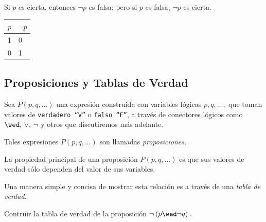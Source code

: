 \begin{definicion}[Negación]
 Si $p$ es cierta, entonces $\neg p$ es falsa; pero si $p$ es falsa, $\neg p$ es cierta.

\end{definicion}

 	\begin{tdv}[Negación] \hfill
 		\label{tdv:not}
 		\begin{center}
 			\begin{tabular}{|l|l|}\hline
 				$p$ & $\neg p$\\\hline
 				1 & 0 \\\hline
 				0 & 1 \\\hline
 			\end{tabular}
 		\end{center}

 	\end{tdv}

\subsection{Proposiciones y Tablas de Verdad}

 Sea $P(p,q,...)$ una expresión construida con variables lógicas $p,q,...,$ que toman valores de \texttt{verdadero ``V''} o \texttt{falso ``F''}, a través de conectores lógicos como $\wed, \, \vee, \, \neg$ y otros  que discutiremos más adelante.

 Tales expresiones $P(p,q,...)$ son llamadas \emph{proposiciones.}

 La propiedad principal de una proposición $P(p,q,...)$ es que sus valores de verdad sólo dependen del valor de sus variables.

 Una manera simple y concisa de mostrar esta relación es a través de una \emph{tabla de verdad.}

 \begin{resuelto}
  Contruir la tabla de verdad de la proposición
  $\neg \left( p \wed \neg q \right).$

 \end{resuelto}



